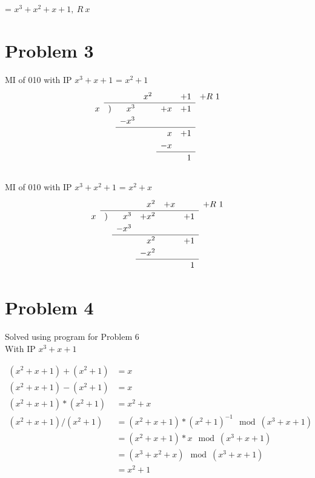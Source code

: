 \documentclass[letterpaper]{article}
\begin{document}
= \(x^3 + x^2 + x + 1,\ R\ x\)

\section{Problem 3}

MI of 010 with IP \(x^3 + x + 1\) = \(x^2 + 1\)\\
\[\def\arraystretch{1.2}
\begin{array}{rlrrrrr}
&&&x^2&&+1&+R\ 1\\
\cline{2-6}
x&)&x^3&&+x&+1&\\
&&-x^3&&&&\\ \cline{3-6}
&&&&x&+1&\\
&&&&-x&&\\ \cline{5-6}
&&&&&1&
\end{array}
\]
\\
MI of 010 with IP \(x^3 + x^2 + 1\) = \(x^2 + x\)\\
\[\def\arraystretch{1.2}
\begin{array}{rlrrrrr}
&&&x^2&+x&&+R\ 1\\
\cline{2-6}
x&)&x^3&+x^2&&+1&\\
&&-x^3&&&&\\ \cline{3-6}
&&&x^2&&+1&\\
&&&-x^2&&&\\ \cline{4-6}
&&&&&1&
\end{array}
\]
\section{Problem 4}
Solved using program for Problem 6\\
With IP \(x^3 + x + 1\)

\begin{equation*}
  \begin{split}
    (x^2 + x + 1) + (x^2 + 1) &= x \\
    (x^2 + x + 1) - (x^2 + 1) &= x \\
    (x^2 + x + 1) * (x^2 + 1) &= x^2 + x \\
    (x^2 + x + 1) / (x^2 + 1) &= (x^2 + x + 1) * (x^2 + 1)^{-1} \mod (x^3 + x + 1) \\
    &= (x^2 + x + 1) * x \mod (x^3 + x + 1)\\
    &= (x^3 + x^2 + x) \mod (x^3 + x + 1)\\
    &= x^2 +1
  \end{split}
\end{equation*}
\end{document}
